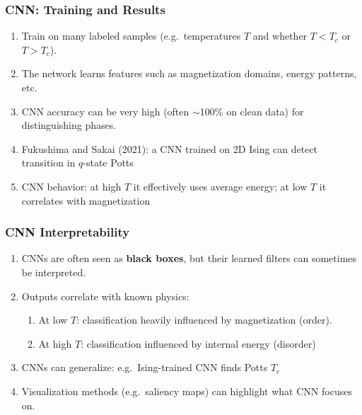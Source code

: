 \documentclass{beamer}
\begin{document}
\begin{frame}
\frametitle{CNN: Training and Results}

\begin{enumerate}
\item Train on many labeled samples (e.g.\ temperatures $T$ and whether $T<T_c$ or $T>T_c$).

\item The network learns features such as magnetization domains, energy patterns, etc.

\item CNN accuracy can be very high (often $\sim$100\% on clean data) for distinguishing phases.

\item Fukushima and Sakai (2021): a CNN trained on 2D Ising can detect transition in $q$-state Potts 

\item CNN behavior: at high $T$ it effectively uses average energy; at low $T$ it correlates with magnetization 
\end{enumerate}

\noindent
\end{frame}

\begin{frame}
\frametitle{CNN Interpretability}

\begin{enumerate}
\item CNNs are often seen as \textbf{black boxes}, but their learned filters can sometimes be interpreted.

\item Outputs correlate with known physics:
\begin{enumerate}

 \item At low $T$: classification heavily influenced by magnetization (order).

 \item At high $T$: classification influenced by internal energy (disorder) 

\end{enumerate}

\noindent
\item CNNs can generalize: e.g.\ Ising-trained CNN finds Potts $T_c$ 

\item Visualization methods (e.g.\ saliency maps) can highlight what CNN focuses on.
\end{enumerate}

\noindent
\end{frame}
\end{document}
